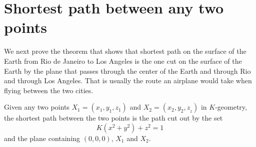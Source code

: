 \documentclass{ximera}
\begin{document}
\section{Shortest path between any two points}

We next prove the theorem that shows that shortest path on the surface
of the Earth from Rio de Janeiro to Los Angeles is the one cut on the
surface of the Earth by the plane that passes through the center of
the Earth and through Rio and through Los Angeles. That is usually the
route an airplane would take when flying between the two cities.


\begin{theorem}
Given any two points $X_{1}=\left(x_{1},y_{1},z_{1}\right) $ and
$X_{2}=\left(x_{2},y_{2},z_{_{2}}\right) $ in $K$-geometry, the
shortest path between the two points is the path cut out by the set
\[
K\left(  x^{2}+y^{2}\right)  +z^{2}=1
\]
and the plane containing $(0,0,0)$, $X_{1}$ and $X_{2}$.
\end{theorem}
\end{document}
